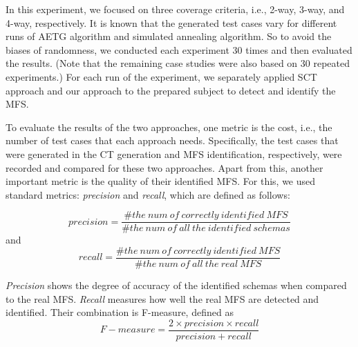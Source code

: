 \documentclass[journal,12pt,onecolumn,draftclsnofoot,]{IEEEtran}
\begin{document}
In this experiment, we focused on three coverage criteria, i.e., 2-way, 3-way, and 4-way, respectively. It is known that the generated test cases vary for different runs of AETG algorithm and simulated annealing algorithm. So to avoid the biases of randomness, we conducted each experiment 30 times and then evaluated the results. (Note that the remaining case studies were also based on 30 repeated experiments.) For each run of the experiment, we separately applied SCT approach and our approach to the prepared subject to detect and identify the MFS.

To evaluate the results of the two approaches, one metric is the cost, i.e., the number of test cases that each approach needs. Specifically, the test cases that were generated in the CT generation and MFS identification, respectively, were recorded and compared for these two approaches.  Apart from this, another important metric is the quality of their identified MFS. For this, we used standard metrics: \emph{precision} and \emph{recall}, which are defined as follows:

$$precision =  \frac{\#the\ num\ of\ correctly\ identified\  MFS}{\#the\ num\ of\ all\ the\ identified\ schemas}$$
and
$$recall  =  \frac{\#the\ num\ of\ correctly\ identified\  MFS}{\#the\ num\ of\ all\ the\ real\ MFS} $$

\emph{Precision} shows the degree of accuracy of the identified schemas when compared to the real MFS. \emph{Recall} measures how well the real MFS are detected and identified. Their combination is F-measure, defined as
$$F-measure = \frac{2 \times precision \times recall}{precision + recall}$$
%
%
%
%
\end{document}

